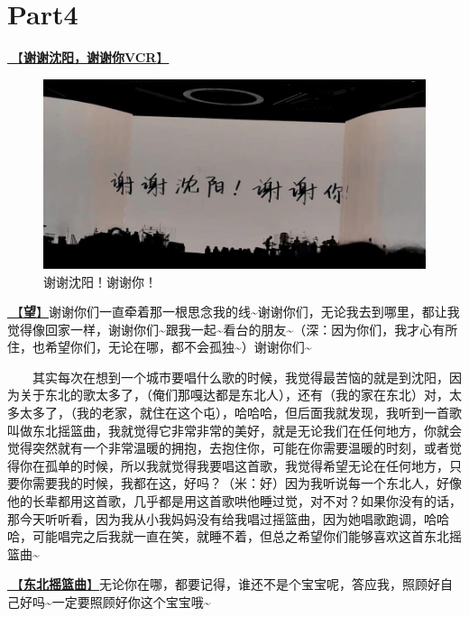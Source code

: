 \documentclass[]{ctexbook}
\begin{document}
\newpage

\section{Part4}\label{shenyang-20240907-part4}

\hyperref[thank-you-vcr]{🎥【\textbf{谢谢沈阳，谢谢你VCR}】}

\begin{figure}

{\centering \includegraphics[width=400pt]{img/shenyang20240907/thank-shenyang} 

}

\caption{谢谢沈阳！谢谢你！}\label{fig:unnamed-chunk-93}
\end{figure}

\hyperref[Gaze]{🎵【\textbf{望}】}谢谢你们一直牵着那一根思念我的线\textasciitilde 谢谢你们，无论我去到哪里，都让我觉得像回家一样，谢谢你们\textasciitilde 跟我一起\textasciitilde 看台的朋友\textasciitilde（深：因为你们，我才心有所住，也希望你们，无论在哪，都不会孤独\textasciitilde）谢谢你们\textasciitilde{}

  其实每次在想到一个城市要唱什么歌的时候，我觉得最苦恼的就是到沈阳，因为关于东北的歌太多了，（俺们那嘎达都是东北人），还有（我的家在东北）对，太多太多了，（我的老家，就住在这个屯），哈哈哈，但后面我就发现，我听到一首歌叫做东北摇篮曲，我就觉得它非常非常的美好，就是无论我们在任何地方，你就会觉得突然就有一个非常温暖的拥抱，去抱住你，可能在你需要温暖的时刻，或者觉得你在孤单的时候，所以我就觉得我要唱这首歌，我觉得希望无论在任何地方，只要你需要我的时候，我都在这，好吗？（米：好）因为我听说每一个东北人，好像他的长辈都用这首歌，几乎都是用这首歌哄他睡过觉，对不对？如果你没有的话，那今天听听看，因为我从小我妈妈没有给我唱过摇篮曲，因为她唱歌跑调，哈哈哈，可能唱完之后我就一直在笑，就睡不着，但总之希望你们能够喜欢这首东北摇篮曲\textasciitilde{}

\hyperref[lullaby]{🎵【\textbf{东北摇篮曲}】}无论你在哪，都要记得，谁还不是个宝宝呢，答应我，照顾好自己好吗\textasciitilde 一定要照顾好你这个宝宝哦\textasciitilde{}
\end{document}
